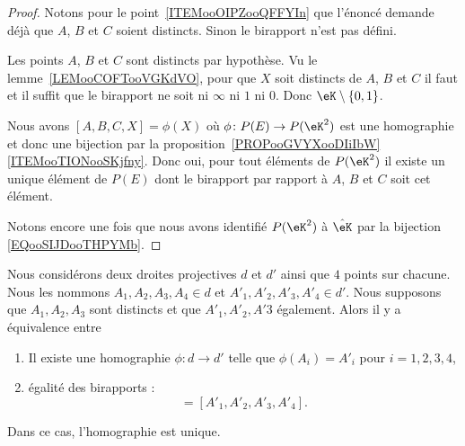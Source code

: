 \begin{proof}
	Notons pour le point~\ref{ITEMooOIPZooQFFYIn} que l'énoncé demande déjà que \( A\), \( B\) et \( C\) soient distincts. Sinon le birapport n'est pas défini.
	\begin{subproof}
		\spitem[\ref{ITEMooBEBEooVfiJXY}]

		Les points \( A\), \( B\) et \( C\) sont distincts par hypothèse. Vu le lemme~\ref{LEMooCOFTooVGKdVO}, pour que \( X\) soit distincts de \( A\), \( B\) et \( C\) il faut et il suffit que le birapport ne soit ni \( \infty\) ni \( 1\) ni \( 0\). Donc \( \eK\setminus\{ 0,1 \}\).

		\spitem[\ref{ITEMooBEBEooVfiJXY}]

		Nous avons \( [A,B,C,X]=\phi(X)\) où \( \phi\colon P(E)\to P(\eK^2)\) est une homographie et donc une bijection par la proposition~\ref{PROPooGVYXooDIiIbW}\ref{ITEMooTIONooSKjfny}. Donc oui, pour tout éléments de \( P(\eK^2)\) il existe un unique élément de \( P(E)\) dont le birapport par rapport à \( A\), \( B\) et \( C\) soit cet élément.

	\end{subproof}
	Notons encore une fois que nous avons identifié \( P(\eK^2)\) à \( \hat\eK\) par la bijection \eqref{EQooSIJDooTHPYMb}.
\end{proof}

\begin{proposition}      \label{PROPooMGYDooHqSoJs}
	Nous considérons deux droites projectives \( d\) et \( d'\) ainsi que \( 4\) points sur chacune. Nous les nommons \( A_1,A_2,A_3,A_4\in d\) et \( A'_1,A'_2,A'_3,A'_4\in d'\). Nous supposons que \( A_1,A_2,A_3\) sont distincts et que \( A'_1,A'_2,A'3\) également. Alors il y a équivalence entre
	\begin{enumerate}
		\item       \label{ITEMooIDKBooXHnNDi}
		      Il existe une homographie \( \phi\colon d\to d'\) telle que \( \phi(A_i)=A'_i\) pour \( i=1,2,3,4\),
		\item       \label{ITEMooCDWAooIckJwT}
		      égalité des birapports :
		      \begin{equation}
			      [A_1,A_2,A_3,A_4]=[A'_1,A'_2,A'_3,A'_4].
		      \end{equation}
	\end{enumerate}
	Dans ce cas, l'homographie est unique.
\end{proposition}

